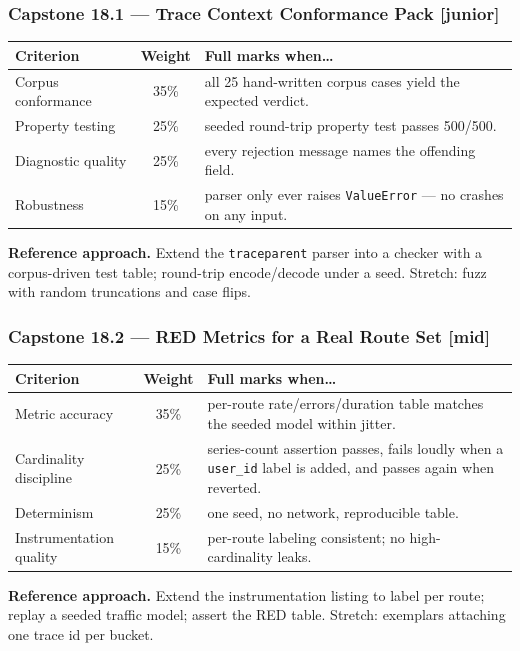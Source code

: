\subsubsection*{Capstone 18.1 --- Trace Context Conformance Pack [junior]}
\begin{center}\small
\begin{tabularx}{\textwidth}{l c X}
\toprule
\textbf{Criterion} & \textbf{Weight} & \textbf{Full marks when\ldots} \\
\midrule
Corpus conformance & 35\% & all 25 hand-written corpus cases yield the expected verdict. \\
Property testing & 25\% & seeded round-trip property test passes 500/500. \\
Diagnostic quality & 25\% & every rejection message names the offending field. \\
Robustness & 15\% & parser only ever raises \texttt{ValueError} --- no crashes on any input. \\
\bottomrule
\end{tabularx}
\end{center}
\textbf{Reference approach.} Extend the \texttt{traceparent} parser into a
checker with a corpus-driven test table; round-trip encode/decode under a
seed. Stretch: fuzz with random truncations and case flips.

\subsubsection*{Capstone 18.2 --- RED Metrics for a Real Route Set [mid]}
\begin{center}\small
\begin{tabularx}{\textwidth}{l c X}
\toprule
\textbf{Criterion} & \textbf{Weight} & \textbf{Full marks when\ldots} \\
\midrule
Metric accuracy & 35\% & per-route rate/errors/duration table matches the seeded model within jitter. \\
Cardinality discipline & 25\% & series-count assertion passes, fails loudly when a \texttt{user\_id} label is added, and passes again when reverted. \\
Determinism & 25\% & one seed, no network, reproducible table. \\
Instrumentation quality & 15\% & per-route labeling consistent; no high-cardinality leaks. \\
\bottomrule
\end{tabularx}
\end{center}
\textbf{Reference approach.} Extend the instrumentation listing to label
per route; replay a seeded traffic model; assert the RED table. Stretch:
exemplars attaching one trace id per bucket.

